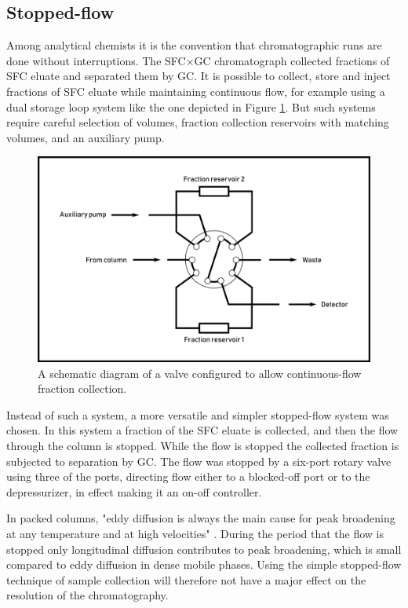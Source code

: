 \subsection{Stopped-flow}
\label{sec:stopflow}

Among analytical chemists it is the convention that chromatographic runs are
done without interruptions. The SFC×GC chromatograph collected fractions
of SFC eluate and separated them by GC. It is possible to collect, store and
inject fractions of SFC eluate while maintaining continuous flow, for example
using a dual storage loop system like the one depicted in Figure
\ref{fig:continuousflow}. But such systems require careful selection of volumes,
fraction collection reservoirs with matching volumes, and an auxiliary pump.

\begin{figure}
\centering
\includegraphics[width=\textwidth]{Figures/ContinuousFlowStopValve.pdf}
\decoRule

\caption[Schematic diagram of a continuous-flow valve.]{A schematic diagram of a
valve configured to allow continuous-flow fraction collection. }

\label{fig:continuousflow}
\end{figure}

Instead of such a system, a more versatile and simpler stopped-flow system was
chosen. In this system a fraction of the SFC eluate is collected, and then the
flow through the column is stopped. While the flow is stopped the collected
fraction is subjected to separation by GC. The flow was stopped by a six-port
rotary valve using three of the ports, directing flow either to a blocked-off
port or to the depressurizer, in effect making it an on-off controller.

In packed columns, "eddy diffusion is always the main cause for peak broadening
at any temperature and at high velocities" \autocite{Gritti2006}. During the
period that the flow is stopped only longitudinal diffusion contributes to peak
broadening, which is small compared to eddy diffusion in dense mobile phases.
Using the simple stopped-flow technique of sample collection will therefore not
have a major effect on the resolution of the \oneD chromatography.



